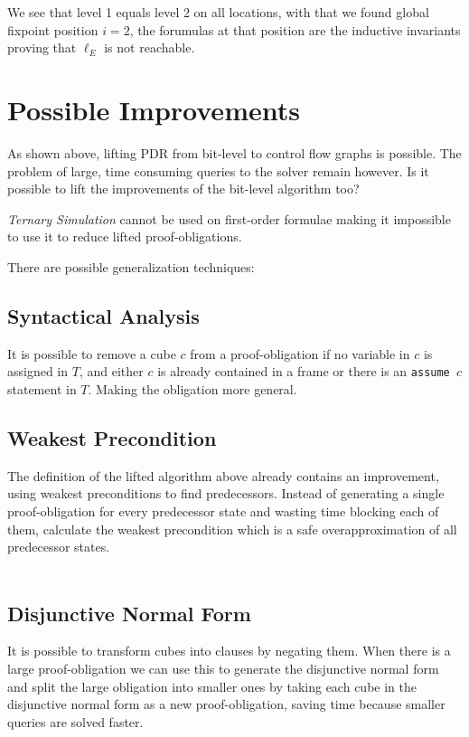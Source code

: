 \documentclass[11pt, a4paper, BCOR=10mm, ngerman]{scrbook}
\begin{document}
\hspace*{5cm}

We see that level 1 equals level 2 on all locations, with that we found global fixpoint position $i = 2$, the forumulas at that position are the inductive invariants proving that $\ell_E$ is not reachable.


\section{Possible Improvements}
\label{improvements}

As shown above, lifting PDR from bit-level to control flow graphs is possible. The problem of large, time consuming queries to the solver remain however. Is it possible to lift the improvements of the bit-level algorithm too? \par

\textsl{Ternary Simulation} cannot be used on first-order formulae making it impossible to use it to reduce lifted proof-obligations. \par
There are possible generalization techniques: \par
\subsection{Syntactical Analysis}
It is possible to remove a cube $c$ from a proof-obligation if no variable in $c$ is assigned in $T$, and either $c$ is already contained in a frame or there is an \texttt{assume $c$} statement in $T$. Making the obligation more general.


\subsection{Weakest Precondition}
The definition of the lifted algorithm above already contains an improvement, using weakest preconditions to find predecessors. Instead of generating a single proof-obligation for every predecessor state and wasting time blocking each of them, calculate the weakest precondition which is a safe overapproximation of all predecessor states. \\ \\


\subsection{Disjunctive Normal Form}
It is possible to transform cubes into clauses by negating them. When there is a large proof-obligation we can use this to generate the disjunctive normal form and split the large obligation into smaller ones by taking each cube in the disjunctive normal form as a new proof-obligation, saving time because smaller queries are solved faster.
\end{document}
